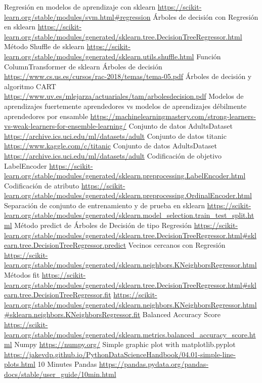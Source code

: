\documentclass[conference,a4paper]{IEEEtran}
\begin{document}
\begin{thebibliography}{00}
 Regresión en modelos de aprendizaje con sklearn \url{https://scikit-learn.org/stable/modules/svm.html#regression}
 Árboles de decisión con Regresión en sklearn \url{https://scikit-learn.org/stable/modules/generated/sklearn.tree.DecisionTreeRegressor.html}
 Método Shuffle de sklearn \url{https://scikit-learn.org/stable/modules/generated/sklearn.utils.shuffle.html}
 Función ColumnTransformer de sklearn 
 Árboles de decisión \url{https://www.cs.us.es/cursos/rac-2018/temas/tema-05.pdf}
 Árboles de decisión y algoritmo CART \url{https://www.uv.es/mlejarza/actuariales/tam/arbolesdecision.pdf}
 Modelos de aprendizajes fuertemente aprendedores vs modelos de aprendizajes débilmente aprendedores por ensamble \url{https://machinelearningmastery.com/strong-learners-vs-weak-learners-for-ensemble-learning/}
 Conjunto de datos AdultsDataset \url{https://archive.ics.uci.edu/ml/datasets/adult}
 Conjunto de datos titanic \url{https://www.kaggle.com/c/titanic}
 Conjunto de datos AdultsDataset \url{https://archive.ics.uci.edu/ml/datasets/adult}
 Codificación de objetivo LabelEncoder \url{https://scikit-learn.org/stable/modules/generated/sklearn.preprocessing.LabelEncoder.html}
 Codificación de atributo \url{https://scikit-learn.org/stable/modules/generated/sklearn.preprocessing.OrdinalEncoder.html}
 Separación de conjunto de entrenamiento y de prueba en sklearn \url{https://scikit-learn.org/stable/modules/generated/sklearn.model_selection.train_test_split.html}
 Método predict de Árboles de Decisión de tipo Regresión \url{https://scikit-learn.org/stable/modules/generated/sklearn.tree.DecisionTreeRegressor.html#sklearn.tree.DecisionTreeRegressor.predict}
 Vecinos cercanos con Regresión \url{https://scikit-learn.org/stable/modules/generated/sklearn.neighbors.KNeighborsRegressor.html}
 Métodos fit \url{https://scikit-learn.org/stable/modules/generated/sklearn.tree.DecisionTreeRegressor.html#sklearn.tree.DecisionTreeRegressor.fit} \url{https://scikit-learn.org/stable/modules/generated/sklearn.neighbors.KNeighborsRegressor.html#sklearn.neighbors.KNeighborsRegressor.fit}
 Balanced Accuracy Score \url{https://scikit-learn.org/stable/modules/generated/sklearn.metrics.balanced_accuracy_score.html}
 Numpy \url{https://numpy.org/}
 Simple graphic plot with matplotlib.pyplot \url{https://jakevdp.github.io/PythonDataScienceHandbook/04.01-simple-line-plots.html}
 10 Minutes Pandas \url{https://pandas.pydata.org/pandas-docs/stable/user_guide/10min.html}
\end{thebibliography}
\end{document}
